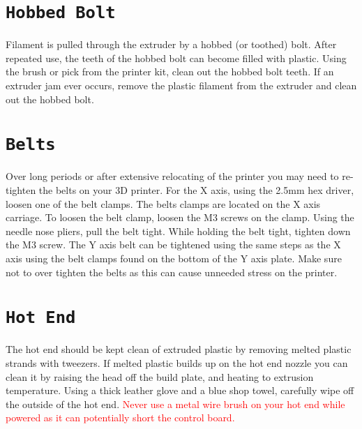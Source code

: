 \section{\texttt{Hobbed Bolt}}
Filament is pulled through the extruder by a hobbed (or toothed) bolt. After repeated use, the teeth of the hobbed bolt can become filled with plastic. Using the brush or pick from the printer kit, clean out the hobbed bolt teeth. If an extruder jam ever occurs, remove the plastic filament from the extruder and clean out the hobbed bolt.

\begin{comment}
\section{Software}
\index{software}
\index{download}
Aleph Objects, Inc.\textsuperscript{\miniscule{\textregistered}} will release a new stable version of Cura LulzBot\textsuperscript{\miniscule{\textregistered}} Edition, typically every quarter. It is best to update Cura every time a new version is released. Each software update can bring advances in print quality, reliability, and print times. The files are available at \texttt{http://lulzbot.com/cura}. You can also find updated software versions in the Download section at: \texttt{http://LulzBot.com/downloads}.
\end{comment}

\section{\texttt{Belts}}
Over long periods or after extensive relocating of the printer you may need to re-tighten the belts on your 3D printer. For the X axis, using the 2.5mm hex driver, loosen one of the belt clamps. The belts clamps are located on the X axis carriage. To loosen the belt clamp, loosen the M3 screws on the clamp. Using the needle nose pliers, pull the belt tight. While holding the belt tight, tighten down the M3 screw. The Y axis belt can be tightened using the same steps as the X axis using the belt clamps found on the bottom of the Y axis plate. Make sure not to over tighten the belts as this can cause unneeded stress on the printer.

\section{\texttt{Hot End}}
The hot end should be kept clean of extruded plastic by removing melted plastic strands with tweezers. If melted plastic builds up on the hot end nozzle you can clean it by raising the head off the build plate, and heating to extrusion temperature. Using a thick leather glove and a blue shop towel, carefully wipe off the outside of the hot end. \textcolor{red}{Never use a metal wire brush on your hot end while powered as it can potentially short the control board.}

